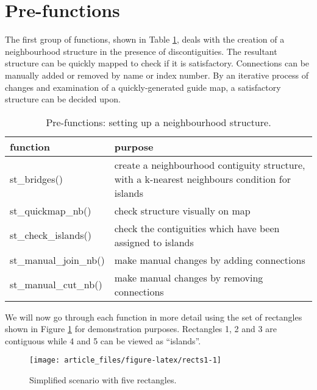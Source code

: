 \hypertarget{pre-functions}{%
\section{Pre-functions}\label{pre-functions}}

The first group of functions, shown in Table \ref{tab:prefunc-latex}, deals with the creation
of a neighbourhood structure in the presence of discontiguities. The
resultant structure can be quickly mapped to check if it is
satisfactory. Connections can be manually added or removed by name or
index number. By an iterative process of changes and examination of a
quickly-generated guide map, a satisfactory structure can be decided upon.

\begin{table}

\caption{\label{tab:prefunc-latex}Pre-functions: setting up a neighbourhood structure.}
\centering
\fontsize{9}{11}\selectfont
\begin{tabular}[t]{l|>{\raggedright\arraybackslash}p{7cm}}
\hline
\textbf{function} & \textbf{purpose}\\
\hline
st\_bridges() & create a neighbourhood contiguity structure, with a k-nearest neighbours condition for islands\\
\hline
st\_quickmap\_nb() & check structure visually on map\\
\hline
st\_check\_islands() & check the contiguities which have been assigned to islands\\
\hline
st\_manual\_join\_nb() & make manual changes by adding connections\\
\hline
st\_manual\_cut\_nb() & make manual changes by removing connections\\
\hline
\end{tabular}
\end{table}

We will now go through each function in more detail using the set of rectangles shown in Figure \ref{fig:rects1} for demonstration purposes. Rectangles 1, 2 and 3 are contiguous while 4 and 5 can be viewed as ``islands''.

\begin{figure}

{\centering \texttt{[image: article\_files/figure-latex/rects1-1]} 

}

\caption{Simplified scenario with five rectangles. }\label{fig:rects1}
\end{figure}

